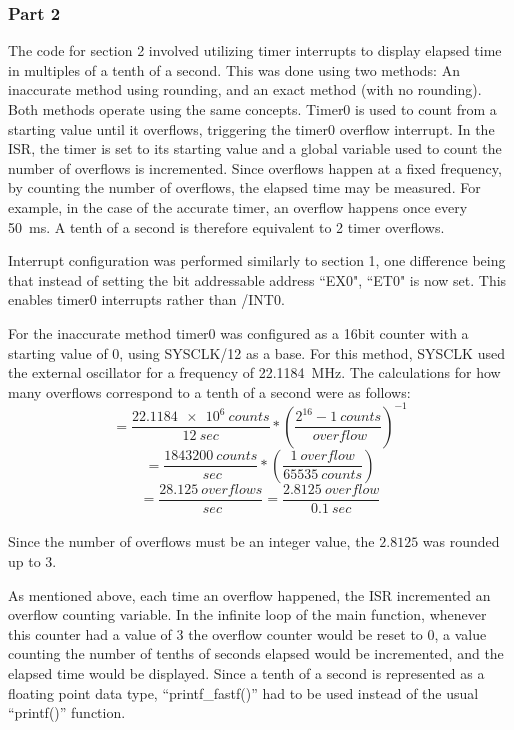 \documentclass[12pt]{article}
\begin{document}
\subsubsection{Part 2}
The code for section 2 involved utilizing timer interrupts to display elapsed time in multiples of a tenth of a second. This was done using two methods: An inaccurate method using rounding, and an exact method (with no rounding). Both methods operate using the same concepts. Timer0 is used to count from a starting value until it overflows, triggering the timer0 overflow interrupt. In the ISR, the timer is set to its starting value and a global variable used to count the number of overflows is incremented. Since overflows happen at a fixed frequency, by counting the number of overflows, the elapsed time may be measured. For example, in the case of the accurate timer, an overflow happens once every \SI{50}{ms}. A tenth of a second is therefore equivalent to 2 timer overflows. 

Interrupt configuration was performed similarly to section 1, one difference being that instead of setting the bit addressable address ``EX0", ``ET0" is now set. This enables timer0 interrupts rather than /INT0. 

For the inaccurate method timer0 was configured as a 16bit counter with a starting value of 0, using SYSCLK/12 as a base. For this method, SYSCLK used the external oscillator for a frequency of \SI{22.1184}{MHz}. The calculations for how many overflows correspond to a tenth of a second were as follows:\\
\begin{equation}
	= \frac{\SI{22.1184e6}{counts}}{\SI{12}{sec}}*{\left(\frac{2^{16}- \SI{1}{counts}}{\SI{}{overflow}}\right)}^{-1}
\end{equation}
\begin{equation}
	= \frac{\SI{1843200}{counts}}{\SI{}{sec}}*\left(\frac{\SI{1}{overflow}}{\SI{65535}{counts}}\right)
\end{equation}
\begin{equation}
	= \frac{\SI{28.125}{overflows}}{\SI{}{sec}} = \frac{\SI{2.8125}{overflow}}{\SI{0.1}{sec}}
\end{equation}\\
Since the number of overflows must be an integer value, the $2.8125$ was rounded up to $3$.

As mentioned above, each time an overflow happened, the ISR incremented an overflow counting variable. In the infinite loop of the main function, whenever this counter had a value of $3$ the overflow counter would be reset to 0, a value counting the number of tenths of seconds elapsed would be incremented, and the elapsed time would be displayed. Since a tenth of a second is represented as a floating point data type, ``printf\_fastf()'' had to be used instead of the usual ``printf()'' function.
\end{document}
